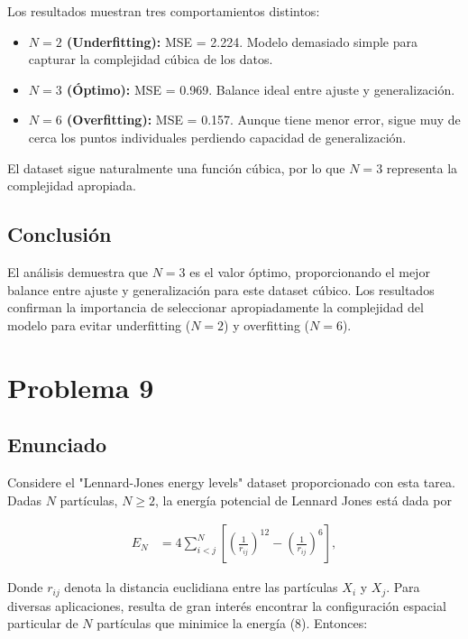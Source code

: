 \documentclass{article}
\begin{document}
Los resultados muestran tres comportamientos distintos:

\begin{itemize}
    \item \textbf{$N=2$ (Underfitting):} MSE = 2.224. Modelo demasiado simple para capturar la complejidad cúbica de los datos.
    \item \textbf{$N=3$ (Óptimo):} MSE = 0.969. Balance ideal entre ajuste y generalización.
    \item \textbf{$N=6$ (Overfitting):} MSE = 0.157. Aunque tiene menor error, sigue muy de cerca los puntos individuales perdiendo capacidad de generalización.
\end{itemize}

El dataset sigue naturalmente una función cúbica, por lo que $N=3$ representa la complejidad apropiada.

\subsection{Conclusión}

El análisis demuestra que $N=3$ es el valor óptimo, proporcionando el mejor balance entre ajuste y generalización para este dataset cúbico. Los resultados confirman la importancia de seleccionar apropiadamente la complejidad del modelo para evitar underfitting ($N=2$) y overfitting ($N=6$).

\section{Problema 9}

\subsection{Enunciado}

Considere el "Lennard-Jones energy levels" dataset proporcionado con esta tarea. Dadas $N$ partículas, $N \ge 2$, la energía potencial de Lennard Jones está dada por

\begin{align} \tag{8}
    E_N &= 4 \sum_{i<j}^{N} \left[ \left(\frac{1}{r_{ij}}\right)^{12} - \left(\frac{1}{r_{ij}}\right)^{6} \right],
\end{align}

Donde $r_{ij}$ denota la distancia euclidiana entre las partículas $X_i$ y $X_j$. Para diversas aplicaciones, resulta de gran interés encontrar la configuración espacial particular de $N$ partículas que minimice la energía (8). Entonces:
\end{document}
